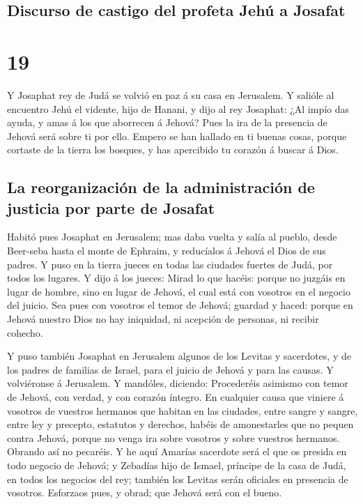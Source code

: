\hypertarget{discurso-de-castigo-del-profeta-jehuxfa-a-josafat}{%
\subsection{Discurso de castigo del profeta Jehú a
Josafat}\label{discurso-de-castigo-del-profeta-jehuxfa-a-josafat}}

\hypertarget{section-18}{%
\section{19}\label{section-18}}

 Y Josaphat rey de Judá se volvió en paz á su casa en
Jerusalem.  Y salióle al encuentro Jehú el vidente, hijo
de Hanani, y dijo al rey Josaphat: ¿Al impío das ayuda, y amas á los que
aborrecen á Jehová? Pues la ira de la presencia de Jehová será sobre ti
por ello.  Empero se han hallado en ti buenas cosas,
porque cortaste de la tierra los bosques, y has apercibido tu corazón á
buscar á Dios.

\hypertarget{la-reorganizaciuxf3n-de-la-administraciuxf3n-de-justicia-por-parte-de-josafat}{%
\subsection{La reorganización de la administración de justicia por parte
de
Josafat}\label{la-reorganizaciuxf3n-de-la-administraciuxf3n-de-justicia-por-parte-de-josafat}}

 Habitó pues Josaphat en Jerusalem; mas daba vuelta y
salía al pueblo, desde Beer-seba hasta el monte de Ephraim, y reducíalos
á Jehová el Dios de sus padres.  Y puso en la tierra
jueces en todas las ciudades fuertes de Judá, por todos los lugares.
 Y dijo á los jueces: Mirad lo que hacéis: porque no
juzgáis en lugar de hombre, sino en lugar de Jehová, el cual está con
vosotros en el negocio del juicio.  Sea pues con vosotros
el temor de Jehová; guardad y haced: porque en Jehová nuestro Dios no
hay iniquidad, ni acepción de personas, ni recibir cohecho.

 Y puso también Josaphat en Jerusalem algunos de los
Levitas y sacerdotes, y de los padres de familias de Israel, para el
juicio de Jehová y para las causas. Y volviéronse á Jerusalem.
 Y mandóles, diciendo: Procederéis asimismo con temor de
Jehová, con verdad, y con corazón íntegro.  En cualquier
causa que viniere á vosotros de vuestros hermanos que habitan en las
ciudades, entre sangre y sangre, entre ley y precepto, estatutos y
derechos, habéis de amonestarles que no pequen contra Jehová, porque no
venga ira sobre vosotros y sobre vuestros hermanos. Obrando así no
pecaréis.  Y he aquí Amarías sacerdote será el que os
presida en todo negocio de Jehová; y Zebadías hijo de Ismael, príncipe
de la casa de Judá, en todos los negocios del rey; también los Levitas
serán oficiales en presencia de vosotros. Esforzaos pues, y obrad; que
Jehová será con el bueno.

